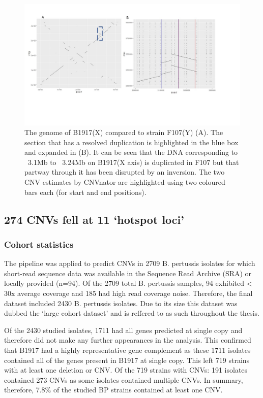 \documentclass{article}
\begin{document}
\begin{figure}[h!]
\centering
\includegraphics[width=\textwidth{}]{Chapter_1/f701 new.jpg}
\caption{The genome of B1917(X) compared to strain F107(Y) (A). The section that has a resolved duplication is highlighted in the blue box and expanded in (B). It can be seen that the DNA corresponding to ~3.1Mb to ~3.24Mb on B1917(X axis) is duplicated in F107 but that partway through it has been disrupted by an inversion. The two CNV estimates by CNVnator are highlighted using two coloured bars each (for start and end positions).}
\label{fig:F701}
\end{figure}

\subsection{274 CNVs fell at 11 `hotspot loci'}

\subsubsection{Cohort statistics}

The pipeline was applied to predict CNVs in 2709 B. pertussis isolates for which short-read sequence data was available in the Sequence Read Archive (SRA) or locally provided (n=94). Of the 2709 total B. pertussis samples, 94 exhibited < 30x average coverage and 185 had high read coverage noise. Therefore, the final dataset included 2430 B. pertussis isolates. Due to its size this dataset was dubbed the `large cohort dataset' and is reffered to as such throughout the thesis. 

Of the 2430 studied isolates, 1711 had all genes predicted at single copy and therefore did not make any further appearances in the analysis. This confirmed that B1917 had a highly representative gene complement as these 1711 isolates contained all of the genes present in B1917 at single copy. This left 719 strains with at least one deletion or CNV. Of the 719 strains with CNVs: 191 isolates contained 273 CNVs as some isolates contained multiple CNVs. In summary, therefore, 7.8\% of the studied BP strains contained at least one CNV.
\end{document}

